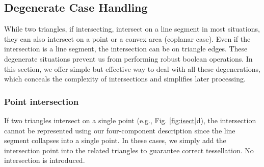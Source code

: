 \documentclass[10pt,journal,compsoc]{IEEEtran}
\begin{document}
\subsection{Degenerate Case Handling}
\label{sec:degenerate}

While two triangles, if intersecting, intersect on a line segment in most situations, they can also intersect on a point or a convex area (coplanar case). Even if the intersection is a line segment, the intersection can be on triangle edges. These degenerate situations prevent us from performing robust boolean operations. In this section, we offer simple but effective way to deal with all these degenerations, which conceals the complexity of intersections and simplifies later processing.

\subsubsection{Point intersection}
\label{sec:ipoint}
If two triangles intersect on a single point (e.g., Fig. \ref{fig:isect}d), the intersection cannot be represented using our four-component description since the line segment collapses into a single point. In these cases, we simply add the intersection point into the related triangles to guarantee correct tessellation. No intersection is introduced.
\end{document}
